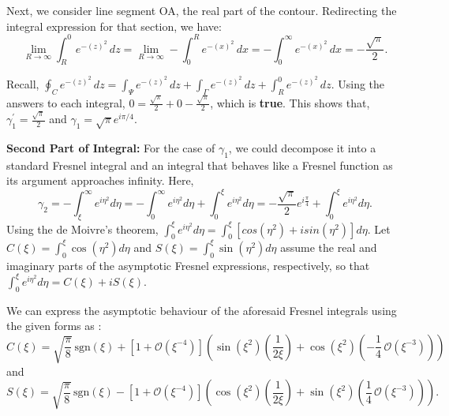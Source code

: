 \documentclass{article}
\begin{document}
Next, we consider line segment OA, the real part of the contour. Redirecting the integral expression for that section, we have:
\begin{equation}
 \lim_{{R \to \infty}} \int_{R}^{0} e^{-(z)^{2}} \, dz = \lim_{{R \to \infty}} - \int_{0}^{R} e^{-(x)^{2}} \, dx = - \int_{0}^{\infty} e^{-(x)^{2}} \, dx = -\frac{\sqrt{\pi}}{2}.
\end{equation}

Recall, $\oint_{C} e^{-(z)^{2}} \, dz = \int_{\Psi} e^{-(z)^{2}} \, dz + \int_{\Gamma} e^{-(z)^{2}} \, dz + \int_{R}^{0} e^{-(z)^{2}} \, dz.$ Using the answers to each integral, $0 = \frac{\sqrt{\pi}}{2} + 0 - \frac{\sqrt{\pi}}{2}$, which is \textbf{true}. This shows that, $\gamma_{1}^{'} = \frac{\sqrt{\pi}}{2}$ and $\gamma_{1} = \sqrt{\pi}e^{i\pi/4}$.

\vspace{3pt}

\textbf{Second Part of Integral:}
For the case of $\gamma_{1}$, we could decompose it into a standard Fresnel integral and an integral that behaves like a Fresnel function as its argument approaches infinity. Here,
\begin{equation}
\gamma_{2} = - \int_{\xi}^{\infty}e^{i\eta^{2}}d\eta = -\int_{0}^{\infty}e^{i\eta^{2}}d\eta + \int_{0}^{\xi}e^{i\eta^{2}}d\eta = -\frac{\sqrt{\pi}}{2}e^{i\frac{\pi}{4}} + \int_{0}^{\xi}e^{i\eta^{2}}d\eta.
\end{equation}
Using the de Moivre's theorem, $\int_{0}^{\xi}e^{i\eta^{2}}d\eta = \int_{0}^{\xi}[cos(\eta^{2}) + isin(\eta^{2})]d\eta$. Let $C(\xi) = \int_{0}^{\xi}\cos(\eta^{2})d\eta$ and $S(\xi) =  \int_{0}^{\xi}\sin(\eta^{2})d\eta$ assume the real and imaginary parts of the asymptotic Fresnel expressions, respectively, so that $\int_{0}^{\xi}e^{i\eta^{2}}d\eta = C(\xi) + iS(\xi)$.

\vspace{5pt}

We can express the asymptotic behaviour of the aforesaid Fresnel integrals using the given forms as \cite{abramowitz1968handbook}\cite{enwiki:1181389148}\cite{wolfram-alpha-notebook}: 
\begin{equation}
    C(\xi) = \sqrt{\frac{\pi}{8}}\,\text{sgn}(\xi) + \left[1 + \mathcal{O}\left(\xi^{-4}\right)\right]\left(\sin(\xi^2)\left(\frac{1}{2\xi}\right) + \cos(\xi^2)\left(-\frac{1}{4}\,\mathcal{O}\left(\xi^{-3}\right)\right)\right)
\end{equation}
and
\begin{equation}
   S(\xi) = \sqrt{\frac{\pi}{8}}\,\text{sgn}(\xi) - \left[1 + \mathcal{O}\left(\xi^{-4}\right)\right]\left(\cos(\xi^2)\left(\frac{1}{2\xi}\right) + \sin(\xi^2)\left(\frac{1}{4}\,\mathcal{O}\left(\xi^{-3}\right)\right)\right).
\end{equation}
\end{document}

